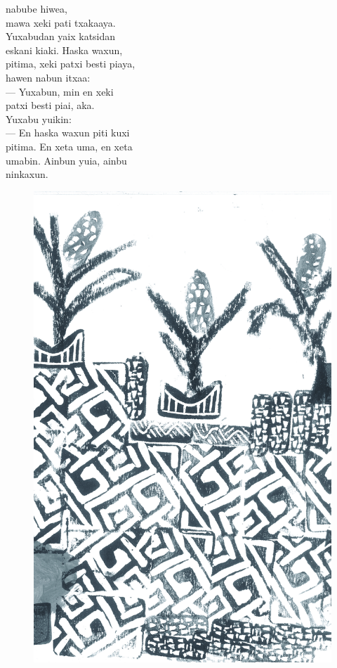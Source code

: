 \vspace{2em}

 nabube hiwea,\\
mawa xeki pati txakaaya.\\
Yuxabudan yaix katsidan\\
eskani kiaki. Haska waxun,\\
pitima, xeki patxi besti piaya,\\
hawen nabun itxaa:\\
--- Yuxabun, min en xeki\\
patxi besti piai, aka.\\
Yuxabu yuikin:\\
--- En haska waxun piti kuxi\\
pitima. En xeta uma, en xeta\\
umabin. Ainbun yuia, ainbu\\
ninkaxun.

\vspace*{\fill}

\pagebreak
\thispagestyle{empty}
\begin{figure}
\vspace*{-1.6cm}
\hspace*{-2.2cm}\includegraphics[width=138mm]{./imgs/img3.jpg}
\end{figure}


